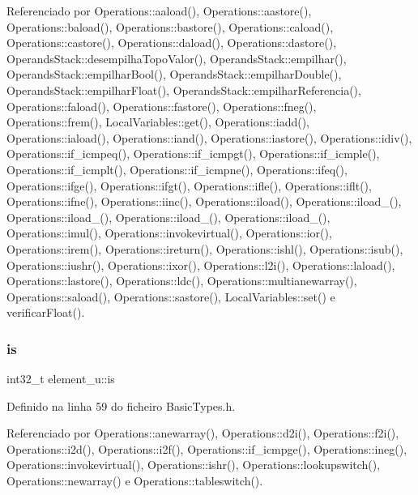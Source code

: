 Referenciado por Operations\+::aaload(), Operations\+::aastore(), Operations\+::baload(), Operations\+::bastore(), Operations\+::caload(), Operations\+::castore(), Operations\+::daload(), Operations\+::dastore(), Operands\+Stack\+::desempilha\+Topo\+Valor(), Operands\+Stack\+::empilhar(), Operands\+Stack\+::empilhar\+Bool(), Operands\+Stack\+::empilhar\+Double(), Operands\+Stack\+::empilhar\+Float(), Operands\+Stack\+::empilhar\+Referencia(), Operations\+::faload(), Operations\+::fastore(), Operations\+::fneg(), Operations\+::frem(), Local\+Variables\+::get(), Operations\+::iadd(), Operations\+::iaload(), Operations\+::iand(), Operations\+::iastore(), Operations\+::idiv(), Operations\+::if\+\_\+icmpeq(), Operations\+::if\+\_\+icmpgt(), Operations\+::if\+\_\+icmple(), Operations\+::if\+\_\+icmplt(), Operations\+::if\+\_\+icmpne(), Operations\+::ifeq(), Operations\+::ifge(), Operations\+::ifgt(), Operations\+::ifle(), Operations\+::iflt(), Operations\+::ifne(), Operations\+::iinc(), Operations\+::iload(), Operations\+::iload\+\_(), Operations\+::iload\+\_(), Operations\+::iload\+\_(), Operations\+::iload\+\_(), Operations\+::imul(), Operations\+::invokevirtual(), Operations\+::ior(), Operations\+::irem(), Operations\+::ireturn(), Operations\+::ishl(), Operations\+::isub(), Operations\+::iushr(), Operations\+::ixor(), Operations\+::l2i(), Operations\+::laload(), Operations\+::lastore(), Operations\+::ldc(), Operations\+::multianewarray(), Operations\+::saload(), Operations\+::sastore(), Local\+Variables\+::set() e verificar\+Float().

\mbox{\label{unionelement__u_a8230539b3b28f57ac3fd61e10c76a740}} 
\subsubsection{\texorpdfstring{is}{is}}
{\footnotesize\ttfamily int32\+\_\+t element\+\_\+u\+::is}



Definido na linha 59 do ficheiro Basic\+Types.\+h.



Referenciado por Operations\+::anewarray(), Operations\+::d2i(), Operations\+::f2i(), Operations\+::i2d(), Operations\+::i2f(), Operations\+::if\+\_\+icmpge(), Operations\+::ineg(), Operations\+::invokevirtual(), Operations\+::ishr(), Operations\+::lookupswitch(), Operations\+::newarray() e Operations\+::tableswitch().

